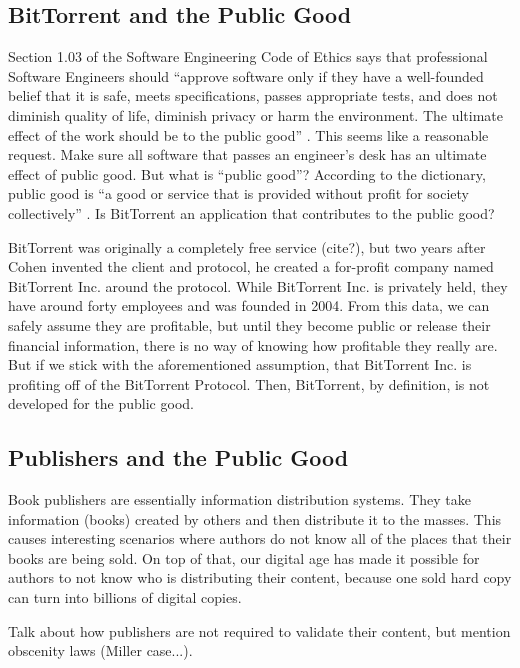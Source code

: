 \documentclass[11pt]{article}
\begin{document}
\subsection{BitTorrent and the Public Good}

Section 1.03 of the Software Engineering Code of Ethics says that professional Software Engineers should ``approve software only if they have a well-founded belief that it is safe, meets specifications, passes appropriate tests, and does not diminish quality of life, diminish privacy or harm the environment. The ultimate effect of the work should be to the public good'' \cite[1.03]{secode}. This seems like a reasonable request. Make sure all software that passes an engineer's desk has an ultimate effect of public good. But what is ``public good''? According to the dictionary, public good is ``a good or service that is provided without profit for society collectively'' \cite{pubgooddef}. Is BitTorrent an application that contributes to the public good?

BitTorrent was originally a completely free service (cite?), but two years after Cohen invented the client and protocol, he created a for-profit company named BitTorrent Inc. around the protocol. While BitTorrent Inc. is privately held, they have around forty employees and was founded in 2004. From this data, we can safely assume they are profitable, but until they become public or release their financial information, there is no way of knowing how profitable they really are. But if we stick with the aforementioned assumption, that BitTorrent Inc. is profiting off of the BitTorrent Protocol. Then, BitTorrent, by definition, is not developed for the public good.

\subsection{Publishers and the Public Good}

Book publishers are essentially information distribution systems. They take information (books) created by others and then distribute it to the masses. This causes interesting scenarios where authors do not know all of the places that their books are being sold. On top of that, our digital age has made it possible for authors to not know who is distributing their content, because one sold hard copy can turn into billions of digital copies.

Talk about how publishers are not required to validate their content, but mention obscenity laws (Miller case...).
\end{document}
